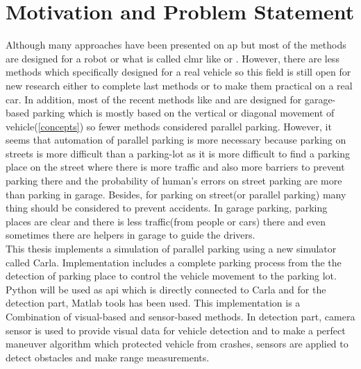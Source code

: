 \section{Motivation and Problem Statement}
Although many approaches have been presented on \acrshort{ap} but most of the methods are designed for a robot or what is called \acrfull{clmr} like \cite{fuzzy} or \cite{twoCircles}. However, there are less methods which specifically designed for a real vehicle so this field is still open for new research either to complete last methods or to make them practical on a real car. In addition, most of the recent methods like \cite{novel-CLMR} and \cite{visual-parking-slot} are designed for garage-based parking which is mostly based on the vertical or diagonal movement of vehicle(\ref{concepts}) so fewer methods considered parallel parking. However, it seems that automation of parallel parking is more necessary because parking on streets is more difficult than a parking-lot as it is more difficult to find a parking place on the street where there is more traffic and also more barriers to prevent parking there and the probability of human's errors on street parking are more than parking in garage. Besides, for parking on street(or parallel parking) many thing should be considered to prevent accidents. In garage parking, parking places are clear and there is less traffic(from people or cars) there and even sometimes there are helpers in garage to guide the drivers.\\
This thesis implements a simulation of parallel parking using a new simulator called Carla. Implementation includes a complete parking process from the the detection of parking place to control the vehicle movement to the parking lot. Python will be used as \acrshort{api} which is directly connected to Carla and for the detection part, Matlab tools has been used. This implementation is a Combination of visual-based and sensor-based methods. In detection part, camera sensor is used to provide visual data for vehicle detection and to make a perfect maneuver algorithm which protected vehicle from crashes, sensors are applied to detect obstacles and make range measurements. 
